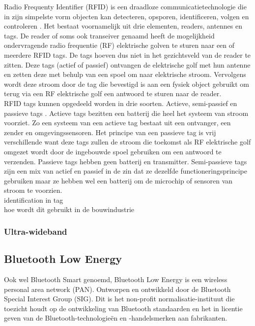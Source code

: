 Radio Frequenty Identifier (RFID)  is een draadloze communicatietechnologie die in zijn simpelste vorm objecten kan detecteren, opsporen, identificeren, volgen en controleren \autocite{Tan2022}. Het bestaat voornamelijk uit drie elementen, readers, antennes en tags. De reader of soms ook transeiver genaamd heeft de mogelijkheid ondervragende radio frequentie (RF) elektrische golven te sturen naar een of meerdere RFID tags. De tags hoeven dus niet in het gezichtsveld van de reader te zitten. Deze tags (actief of passief) ontvangen de elektrische golf met hun antenne en zetten deze met behulp van een spoel om naar elektrische stroom. Vervolgens wordt deze stroom door de tag die bevestigd is aan een fysiek object gebruikt om terug via een RF elektrische golf een antwoord te sturen naar de reader.\\

RFID tags kunnen opgedeeld worden in drie soorten. Actieve, semi-passief en passieve tags \autocite{Mezzanotte2021}.  Actieve tags bezitten een batterij die heel het systeem van stroom voorziet. Zo een systeem van een actieve tag bestaat uit een ontvanger, een zender en omgevingssensoren. Het principe van een passieve tag is vrij verschillende want deze tags zullen de stroom die toekomst als RF elektrische golf omgezet wordt door de ingebouwde spoel gebruiken om een antwoord te verzenden. Passieve tags hebben geen batterij en transmitter. Semi-passieve tags zijn een mix van actief en passief in de zin dat ze dezelfde functioneringsprincipe gebruiken maar ze hebben wel een batterij om de microchip of sensoren van stroom te voorzien.\\


identification in tag
\\
hoe wordt dit gebruikt in de bouwindustrie

\subsubsection{Ultra-wideband}


\subsection{Bluetooth Low Energy}
Ook wel Bluetooth Smart genoemd, Bluetooth Low Energy is een wireless personal area network (PAN). Ontworpen en ontwikkeld door de Bluetooth Special Interest Group (SIG). Dit is het non-profit normalisatie-instituut die toezicht houdt op de ontwikkeling van Bluetooth standaarden en het in licentie geven van de Bluetooth-technologieën en -handelsmerken aan fabrikanten. \\

